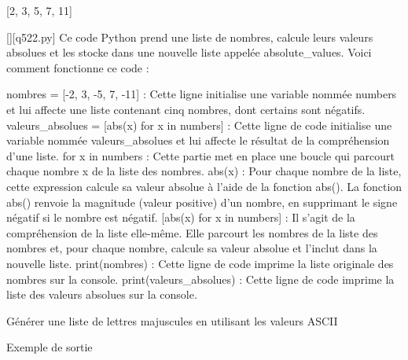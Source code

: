 [2, 3, 5, 7, 11]
        \par
        \begin{solution}
            \renewcommand{\nomfichier}{q522.py}
            \pythonfile{\chemincode \nomfichier}[][\nomfichier]
            Ce code Python prend une liste de nombres, calcule leurs valeurs absolues et les stocke dans une nouvelle liste appelée absolute\_values. Voici comment fonctionne ce code :

    nombres = [-2, 3, -5, 7, -11] : Cette ligne initialise une variable nommée numbers et lui affecte une liste contenant cinq nombres, dont certains sont négatifs.
    valeurs\_absolues = [abs(x) for x in numbers] : Cette ligne de code initialise une variable nommée valeurs\_absolues et lui affecte le résultat de la compréhension d'une liste.
        for x in numbers : Cette partie met en place une boucle qui parcourt chaque nombre x de la liste des nombres.
        abs(x) : Pour chaque nombre de la liste, cette expression calcule sa valeur absolue à l'aide de la fonction abs(). La fonction abs() renvoie la magnitude (valeur positive) d'un nombre, en supprimant le signe négatif si le nombre est négatif.
        [abs(x) for x in numbers] : Il s'agit de la compréhension de la liste elle-même. Elle parcourt les nombres de la liste des nombres et, pour chaque nombre, calcule sa valeur absolue et l'inclut dans la nouvelle liste.
    print(nombres) : Cette ligne de code imprime la liste originale des nombres sur la console.
    print(valeurs\_absolues) : Cette ligne de code imprime la liste des valeurs absolues sur la console.
        \end{solution}
        

        \question
        Générer une liste de lettres majuscules en utilisant les valeurs ASCII

Exemple de sortie

